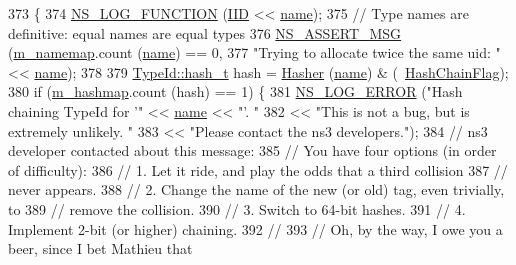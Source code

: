 \begin{DoxyCode}
373 \{
374   \hyperlink{log-macros-disabled_8h_a90b90d5bad1f39cb1b64923ea94c0761}{NS\_LOG\_FUNCTION} (\hyperlink{type-id_8cc_a88c5717498eac8c8d6a06538e6c65d49}{IID} << \hyperlink{generate__test__data__lte__spectrum__model_8m_ab74e6bf80237ddc4109968cedc58c151}{name});
375   \textcolor{comment}{// Type names are definitive: equal names are equal types}
376   \hyperlink{assert_8h_aff5ece9066c74e681e74999856f08539}{NS\_ASSERT\_MSG} (\hyperlink{classns3_1_1IidManager_aff98d5f56a6128126bd28261363472ca}{m\_namemap}.count (\hyperlink{generate__test__data__lte__spectrum__model_8m_ab74e6bf80237ddc4109968cedc58c151}{name}) == 0,
377                  \textcolor{stringliteral}{"Trying to allocate twice the same uid: "} << \hyperlink{generate__test__data__lte__spectrum__model_8m_ab74e6bf80237ddc4109968cedc58c151}{name});
378   
379   \hyperlink{classns3_1_1TypeId_ab3fc1475c4a0c2cfb35b976dbd609057}{TypeId::hash\_t} hash = \hyperlink{classns3_1_1IidManager_ac125cec331e0a7f55910e96aecec2091}{Hasher} (\hyperlink{generate__test__data__lte__spectrum__model_8m_ab74e6bf80237ddc4109968cedc58c151}{name}) & (~\hyperlink{classns3_1_1IidManager_a111b3e20b0fa2fb672257fa63aca771eada8547fce936ccfe8094f1f1f367e53f}{HashChainFlag});
380   \textcolor{keywordflow}{if} (\hyperlink{classns3_1_1IidManager_ac86e0322a1b399335032df212d9675ab}{m\_hashmap}.count (hash) == 1) \{
381     \hyperlink{group__logging_ga0261a8db1d4ac5f79417d117634fd455}{NS\_LOG\_ERROR} (\textcolor{stringliteral}{"Hash chaining TypeId for '"} << \hyperlink{generate__test__data__lte__spectrum__model_8m_ab74e6bf80237ddc4109968cedc58c151}{name} << \textcolor{stringliteral}{"'.  "}
382                  << \textcolor{stringliteral}{"This is not a bug, but is extremely unlikely.  "}
383                  << \textcolor{stringliteral}{"Please contact the ns3 developers."});
384     \textcolor{comment}{// ns3 developer contacted about this message:}
385     \textcolor{comment}{// You have four options (in order of difficulty):}
386     \textcolor{comment}{//   1. Let it ride, and play the odds that a third collision}
387     \textcolor{comment}{//        never appears.}
388     \textcolor{comment}{//   2. Change the name of the new (or old) tag, even trivially, to}
389     \textcolor{comment}{//        remove the collision.}
390     \textcolor{comment}{//   3. Switch to 64-bit hashes.}
391     \textcolor{comment}{//   4. Implement 2-bit (or higher) chaining.}
392     \textcolor{comment}{//}
393     \textcolor{comment}{//  Oh, by the way, I owe you a beer, since I bet Mathieu that}

\end{DoxyCode}
